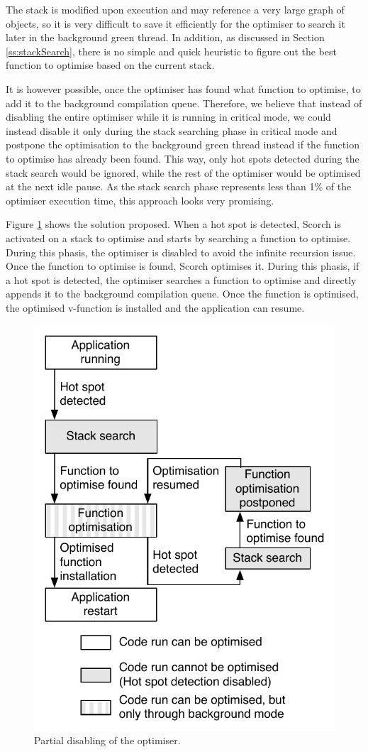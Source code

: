 \documentclass[a4paper,12pt,twoside]{../includes/ThesisStyle}
\begin{document}
The stack is modified upon execution and may reference a very large graph of objects, so it is very difficult to save it efficiently for the optimiser to search it later in the background green thread. In addition, as discussed in Section \ref{ss:stackSearch}, there is no simple and quick heuristic to figure out the best function to optimise based on the current stack. 

It is however possible, once the optimiser has found what function to optimise, to add it to the background compilation queue. Therefore, we believe that instead of disabling the entire optimiser while it is running in critical mode, we could instead disable it only during the stack searching phase in critical mode and postpone the optimisation to the background green thread instead if the function to optimise has already been found. This way, only hot spots detected during the stack search would be ignored, while the rest of the optimiser would be optimised at the next idle pause. As the stack search phase represents less than 1\% of the optimiser execution time, this approach looks very promising.

Figure \ref{fig:PartialDisabling} shows the solution proposed. When a hot spot is detected, Scorch is activated on a stack to optimise and starts by searching a function to optimise. During this phasis, the optimiser is disabled to avoid the infinite recursion issue. Once the function to optimise is found, Scorch optimises it. During this phasis, if a hot spot is detected, the optimiser searches a function to optimise and directly appends it to the background compilation queue. Once the function is optimised, the optimised v-function is installed and the application can resume.

\begin{figure}[h!]
    \begin{center}
        \includegraphics[width=0.55\linewidth]{PartialDisabling}
        \caption{Partial disabling of the optimiser.}
        \label{fig:PartialDisabling}
    \end{center}
\end{figure}
\end{document}
